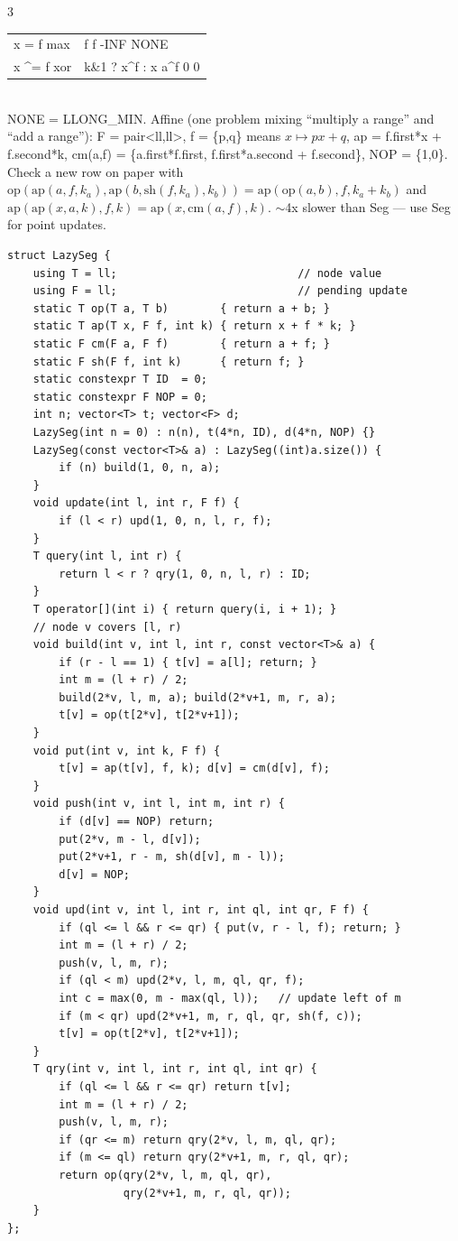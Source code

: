 \documentclass[9pt,a4paper]{extarticle}
\makeatletter
\newcommand{\code}[1]{{\ttfamily\small #1}}
\newenvironment{ctab}[2]{%
  \begingroup\setlength{\tabcolsep}{3pt}%
  \begin{tabular}{@{}p{#1\columnwidth}p{#2\columnwidth}@{}}}%
  {\end{tabular}\endgroup}
\makeatother
\begin{document}
\begin{multicols*}{3}
{{\begin{ctab}{0.30}{0.65}
x = f \hfill max & f \hfill f \hfill -INF \hfill NONE\\
x \textasciicircum= f \hfill xor & k\&1 ? x\textasciicircum f : x \hfill a\textasciicircum f \hfill 0 \hfill 0\\
\end{ctab}}\\[0.3ex]
\code{NONE = LLONG\_MIN}. Affine (one problem mixing ``multiply a range'' and ``add a
range''): \code{F = pair<ll,ll>}, \code{f = \{p,q\}} means $x \mapsto px+q$,
\code{ap = f.first*x + f.second*k}, \code{cm(a,f) = \{a.first*f.first,
f.first*a.second + f.second\}}, \code{NOP = \{1,0\}}.\\[0.3ex]
Check a new row on paper with
$\mathrm{op}(\mathrm{ap}(a,f,k_a), \mathrm{ap}(b,\mathrm{sh}(f,k_a),k_b)) = \mathrm{ap}(\mathrm{op}(a,b), f, k_a{+}k_b)$
and $\mathrm{ap}(\mathrm{ap}(x,a,k),f,k) = \mathrm{ap}(x,\mathrm{cm}(a,f),k)$.
$\sim$4x slower than \code{Seg} --- use \code{Seg} for point updates.}

\begin{lstlisting}
struct LazySeg {
    using T = ll;                            // node value
    using F = ll;                            // pending update
    static T op(T a, T b)        { return a + b; }
    static T ap(T x, F f, int k) { return x + f * k; }
    static F cm(F a, F f)        { return a + f; }
    static F sh(F f, int k)      { return f; }
    static constexpr T ID  = 0;
    static constexpr F NOP = 0;
    int n; vector<T> t; vector<F> d;
    LazySeg(int n = 0) : n(n), t(4*n, ID), d(4*n, NOP) {}
    LazySeg(const vector<T>& a) : LazySeg((int)a.size()) {
        if (n) build(1, 0, n, a);
    }
    void update(int l, int r, F f) {
        if (l < r) upd(1, 0, n, l, r, f);
    }
    T query(int l, int r) {
        return l < r ? qry(1, 0, n, l, r) : ID;
    }
    T operator[](int i) { return query(i, i + 1); }
    // node v covers [l, r)
    void build(int v, int l, int r, const vector<T>& a) {
        if (r - l == 1) { t[v] = a[l]; return; }
        int m = (l + r) / 2;
        build(2*v, l, m, a); build(2*v+1, m, r, a);
        t[v] = op(t[2*v], t[2*v+1]);
    }
    void put(int v, int k, F f) {
        t[v] = ap(t[v], f, k); d[v] = cm(d[v], f);
    }
    void push(int v, int l, int m, int r) {
        if (d[v] == NOP) return;
        put(2*v, m - l, d[v]);
        put(2*v+1, r - m, sh(d[v], m - l));
        d[v] = NOP;
    }
    void upd(int v, int l, int r, int ql, int qr, F f) {
        if (ql <= l && r <= qr) { put(v, r - l, f); return; }
        int m = (l + r) / 2;
        push(v, l, m, r);
        if (ql < m) upd(2*v, l, m, ql, qr, f);
        int c = max(0, m - max(ql, l));   // update left of m
        if (m < qr) upd(2*v+1, m, r, ql, qr, sh(f, c));
        t[v] = op(t[2*v], t[2*v+1]);
    }
    T qry(int v, int l, int r, int ql, int qr) {
        if (ql <= l && r <= qr) return t[v];
        int m = (l + r) / 2;
        push(v, l, m, r);
        if (qr <= m) return qry(2*v, l, m, ql, qr);
        if (m <= ql) return qry(2*v+1, m, r, ql, qr);
        return op(qry(2*v, l, m, ql, qr),
                  qry(2*v+1, m, r, ql, qr));
    }
};
\end{lstlisting}


\end{multicols*}
\end{document}

